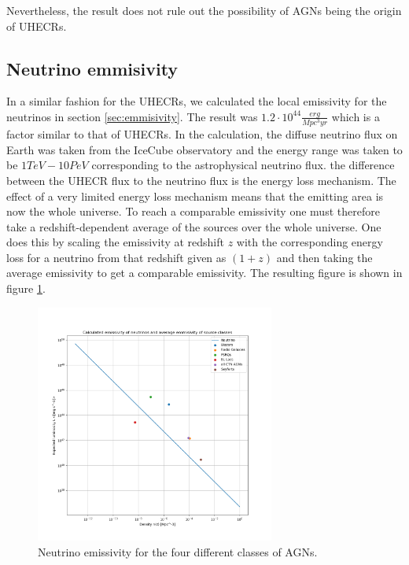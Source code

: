 \documentclass{article}
\begin{document}
Nevertheless, the result does not rule out the possibility of AGNs being the origin of UHECRs. 


\subsection{Neutrino emmisivity}
In a similar fashion for the UHECRs, we calculated the local emissivity for the neutrinos in section \ref{sec:emmisivity}. The result was $1.2 \cdot 10^{44}\frac{erg}{Mpc^3yr}$ which is a factor similar to that of UHECRs.
In the calculation, the diffuse neutrino flux on Earth was taken from the IceCube observatory \cite{Abbasi_2022} and the energy range was taken to be $1TeV - 10PeV$ corresponding to the astrophysical neutrino flux.
the difference between the UHECR flux to the neutrino flux is the energy loss mechanism. The effect of a very limited energy loss mechanism means that the emitting area is now the whole universe. To reach a comparable emissivity one must therefore take a redshift-dependent average of the sources over the whole universe.
One does this by scaling the emissivity at redshift $z$ with the corresponding energy loss for a neutrino from that redshift given as $(1+z)$ and then taking the average emissivity to get a comparable emissivity.
The resulting figure is shown in figure \ref{fig:neutrino}.

\begin{figure}[H]
    \centering
    \includegraphics[width = 0.7\textwidth]{new_plots/L_n_neut_calc.png}
    \caption{Neutrino emissivity for the four different classes of AGNs.}
    \label{fig:neutrino}
\end{figure}
\end{document}
